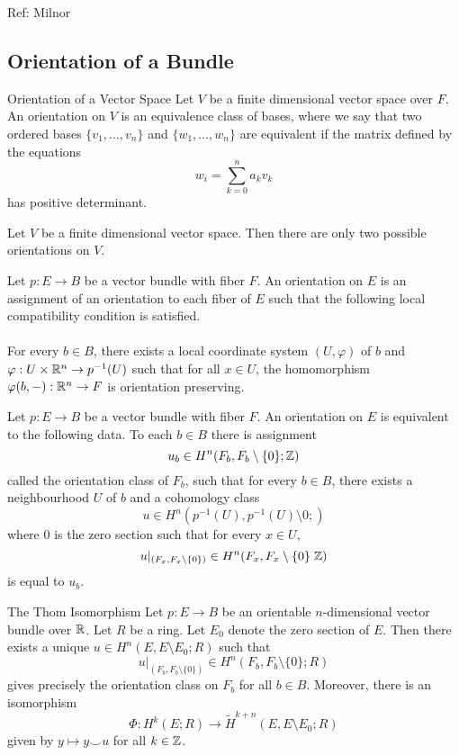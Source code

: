 \documentclass[a4paper]{article}
\begin{document}
Ref: Milnor

\subsection{Orientation of a Bundle}
\begin{defn}{Orientation of a Vector Space}{} Let $V$ be a finite dimensional vector space over $F$. An orientation on $V$ is an equivalence class of bases, where we say that two ordered bases $\{v_1,\dots,v_n\}$ and $\{w_1,\dots,w_n\}$ are equivalent if the matrix defined by the equations $$w_i=\sum_{k=0}^na_kv_k$$ has positive determinant. 
\end{defn}

\begin{lmm}{}{} Let $V$ be a finite dimensional vector space. Then there are only two possible orientations on $V$. 
\end{lmm}

\begin{defn}{}{} Let $p:E\to B$ be a vector bundle with fiber $F$. An orientation on $E$ is an assignment of an orientation to each fiber of $E$ such that the following local compatibility condition is satisfied. \\~\\

For every $b\in B$, there exists a local coordinate system $(U,\varphi)$ of $b$ and $\varphi:U\times\mathbb{R}^n\to p^{-1}(U)$ such that for all $x\in U$, the homomorphism $\varphi(b,-):\mathbb{R}^n\to F$ is orientation preserving. 
\end{defn}

\begin{thm}{}{} Let $p:E\to B$ be a vector bundle with fiber $F$. An orientation on $E$ is equivalent to the following data. To each $b\in B$ there is assignment $$u_b\in H^n(F_b,F_b\setminus\{0\};\mathbb{Z})$$ called the orientation class of $F_b$, such that for every $b\in B$, there exists a neighbourhood $U$ of $b$ and a cohomology class $$u\in H^n(p^{-1}(U),p^{-1}(U)\setminus 0;)$$ where $0$ is the zero section such that for every $x\in U$, $$u|_{(F_x,F_x\setminus\{0\})}\in H^n(F_x,F_x\setminus\{0\}\;\mathbb{Z})$$ is equal to $u_b$. 
\end{thm}

\begin{thm}{The Thom Isomorphism}{} Let $p:E\to B$ be an orientable $n$-dimensional vector bundle over $\mathbb{R}$. Let $R$ be a ring. Let $E_0$ denote the zero section of $E$. Then there exists a unique $u\in H^n(E,E\setminus E_0;R)$ such that $$u|_{(F_b,F_b\setminus\{0\})}\in H^n(F_b,F_b\setminus\{0\};R)$$ gives precisely the orientation class on $F_b$ for all $b\in B$. Moreover, there is an isomorphism $$\Phi:H^k(E;R)\to\widetilde{H}^{k+n}(E,E\setminus E_0;R)$$ given by $y\mapsto y\smile u$ for all $k\in\mathbb{Z}$. 
\end{thm}
\end{document}
